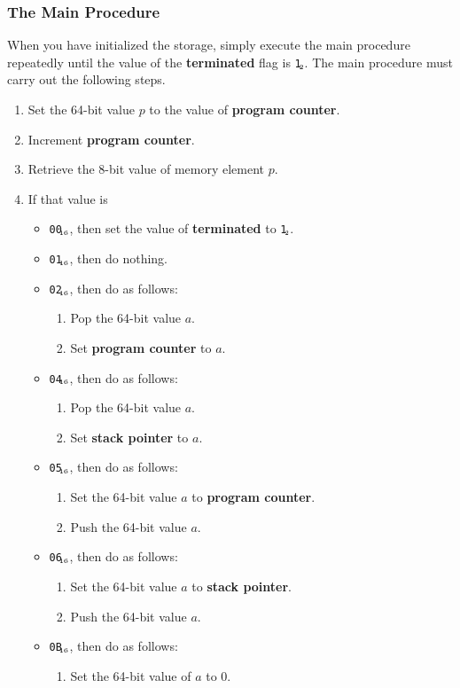 \documentclass[a4paper,12pt]{article}
\newcommand{\num}[1]{\texttt{#1}\xspace}
\newcommand{\hex}[1]{\num{#1}$_{\textup{\tiny\hskip-1ex 16}}$\xspace}
\newcommand{\bin}[1]{\num{#1}$_{\textup{\tiny\hskip-1ex 2}}$\xspace}
\newcommand{\PC}{\textbf{program counter}\xspace}
\newcommand{\SP}{\textbf{stack pointer}\xspace}
\newcommand{\TERM}{\textbf{terminated}\xspace}
\newcommand{\T}{\bin{1}\xspace}
\newcommand{\op}[1]{#1}
\newcommand{\EXIT}      [1]{\op{\hex{00}}\xspace}
\newcommand{\NOP}       [1]{\op{\hex{01}}\xspace}
\newcommand{\JUMP}      [1]{\op{\hex{02}}\xspace}
\newcommand{\SETSP}     [1]{\op{\hex{04}}\xspace}
\newcommand{\GETPC}     [1]{\op{\hex{05}}\xspace}
\newcommand{\GETSP}     [1]{\op{\hex{06}}\xspace}
\newcommand{\PUSHL}     [1]{\op{\hex{0B}}\xspace}
\begin{document}
\subsubsection{The Main Procedure}

When you have initialized the storage, simply execute the main procedure repeatedly until the value of the \TERM flag is \T.
The main procedure must carry out the following steps.
\begin{enumerate}
\item Set the 64-bit value $p$ to the value of \PC.
\item Increment \PC.
\item Retrieve the 8-bit value of memory element $p$.
\item\label{itm:main-case} If that value is
  \begin{itemize}
  \item \EXIT{}, then set the value of  \TERM to \T.
  \item \NOP{}, then do nothing.
  \item \JUMP{}, then do as follows:
    \begin{enumerate}
    \item Pop the 64-bit value $a$.
    \item Set \PC to $a$.
    \end{enumerate}
  \item \SETSP{}, then do as follows:
    \begin{enumerate}
    \item Pop the 64-bit value $a$.
    \item Set \SP to $a$.
    \end{enumerate}
  \item \GETPC{}, then do as follows:
    \begin{enumerate}
    \item Set the 64-bit value $a$ to \PC.
    \item Push the 64-bit value $a$.
    \end{enumerate}
  \item \GETSP{}, then do as follows:
    \begin{enumerate}
    \item Set the 64-bit value $a$ to \SP.
    \item Push the 64-bit value $a$.
    \end{enumerate}
  \item \PUSHL{}, then do as follows:
    \begin{enumerate}
    \item Set the 64-bit value of $a$ to 0.

\end{enumerate}
\end{itemize}
\end{enumerate}
\end{document}

